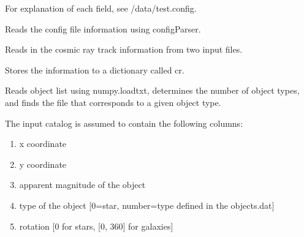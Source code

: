 \documentclass[a4paper,12pt,english]{sphinxmanual}
\begin{document}
\begin{fulllineitems}
\begin{fulllineitems}
For explanation of each field, see /data/test.config.

\end{fulllineitems}


\begin{fulllineitems}
\label{simulator:simulator.simulator.VISsimulator.readConfigs}
Reads the config file information using configParser.

\end{fulllineitems}


\begin{fulllineitems}
\label{simulator:simulator.simulator.VISsimulator.readCosmicRayInformation}
Reads in the cosmic ray track information from two input files.

Stores the information to a dictionary called cr.

\end{fulllineitems}


\begin{fulllineitems}
\label{simulator:simulator.simulator.VISsimulator.readObjectlist}
Reads object list using numpy.loadtxt, determines the number of object types,
and finds the file that corresponds to a given object type.

The input catalog is assumed to contain the following columns:
\begin{enumerate}
\item {} 
x coordinate

\item {} 
y coordinate

\item {} 
apparent magnitude of the object

\item {} 
type of the object {[}0=star, number=type defined in the objects.dat{]}

\item {} 
rotation {[}0 for stars, {[}0, 360{]} for galaxies{]}

\end{enumerate}


\end{fulllineitems}
\end{fulllineitems}
\end{document}
